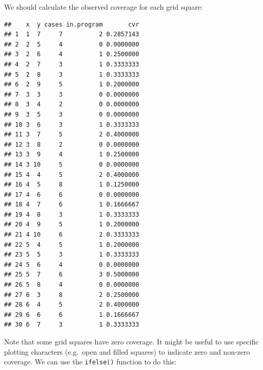 \documentclass[12pt,a4paper]{book}
\newenvironment{Shaded}{\begin{snugshade}}{\end{snugshade}}
\newcommand{\KeywordTok}[1]{\textcolor[rgb]{0.13,0.29,0.53}{\textbf{#1}}}
\newcommand{\DecValTok}[1]{\textcolor[rgb]{0.00,0.00,0.81}{#1}}
\newcommand{\StringTok}[1]{\textcolor[rgb]{0.31,0.60,0.02}{#1}}
\newcommand{\OperatorTok}[1]{\textcolor[rgb]{0.81,0.36,0.00}{\textbf{#1}}}
\newcommand{\NormalTok}[1]{#1}
\theoremstyle{definition}
\theoremstyle{definition}
\theoremstyle{definition}
\theoremstyle{remark}
\begin{document}
We should calculate the observed coverage for each grid square:

\begin{Shaded}
\end{Shaded}

\begin{verbatim}
##    x  y cases in.program       cvr
## 1  1  7     7          2 0.2857143
## 2  2  5     4          0 0.0000000
## 3  2  6     4          1 0.2500000
## 4  2  7     3          1 0.3333333
## 5  2  8     3          1 0.3333333
## 6  2  9     5          1 0.2000000
## 7  3  3     3          0 0.0000000
## 8  3  4     2          0 0.0000000
## 9  3  5     3          0 0.0000000
## 10 3  6     3          1 0.3333333
## 11 3  7     5          2 0.4000000
## 12 3  8     2          0 0.0000000
## 13 3  9     4          1 0.2500000
## 14 3 10     5          0 0.0000000
## 15 4  4     5          2 0.4000000
## 16 4  5     8          1 0.1250000
## 17 4  6     6          0 0.0000000
## 18 4  7     6          1 0.1666667
## 19 4  8     3          1 0.3333333
## 20 4  9     5          1 0.2000000
## 21 4 10     6          2 0.3333333
## 22 5  4     5          1 0.2000000
## 23 5  5     3          1 0.3333333
## 24 5  6     4          0 0.0000000
## 25 5  7     6          3 0.5000000
## 26 5  8     4          0 0.0000000
## 27 6  3     8          2 0.2500000
## 28 6  4     5          2 0.4000000
## 29 6  6     6          1 0.1666667
## 30 6  7     3          1 0.3333333
\end{verbatim}

Note that some grid squares have zero coverage. It might be useful to
use specific plotting characters (e.g.~open and filled squares) to
indicate zero and non-zero coverage. We can use the \texttt{ifelse()}
function to do this:

\begin{Shaded}
\end{Shaded}
\end{document}
